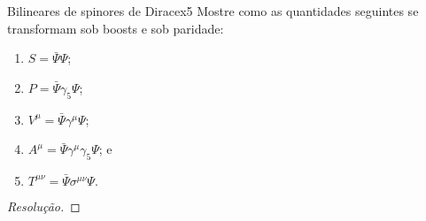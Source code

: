 \begin{exercício}{Bilineares de spinores de Dirac}{ex5}
    Mostre como as quantidades seguintes se transformam sob boosts e sob paridade:
    \begin{enumerate}[label=(\alph*)]
        \item \(S = \bar{\Psi}\Psi\);
        \item \(P = \bar{\Psi}\gamma_5\Psi\);
        \item \(V^\mu = \bar{\Psi}\gamma^\mu \Psi\);
        \item \(A^\mu = \bar{\Psi}\gamma^\mu\gamma_5\Psi\); e
        \item \(T^{\mu\nu} = \bar{\Psi} \sigma^{\mu\nu} \Psi.\)
    \end{enumerate}
\end{exercício}
\begin{proof}[Resolução]
    
\end{proof}
